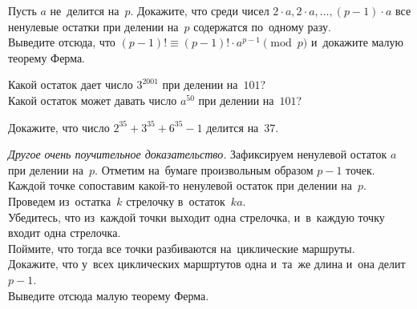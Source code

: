 \begin{problems}

\item
\subproblem
Пусть $a$ не~делится на~$p$.
Докажите, что среди чисел $2 \cdot a, 2 \cdot a, \ldots, (p - 1) \cdot a$ все
ненулевые остатки при делении на~$p$ содержатся по~одному разу.
\\
\subproblem
Выведите отсюда, что $(p - 1)! \equiv (p-1)! \cdot a^{p-1} \pmod{p}$ и~докажите
малую теорему Ферма.

\item
\subproblem
Какой остаток дает число $3^{2001}$ при делении на~$101$?
\\
\subproblem
Какой остаток может давать число $a^{50}$ при делении на~$101$?

\item
Докажите, что число $2^{35} + 3^{35} + 6^{35} - 1$ делится на~$37$.

\item
\emph{Другое очень поучительное доказательство.}
Зафиксируем ненулевой остаток $a$ при делении на~$p$.
Отметим на~бумаге произвольным образом $p - 1$ точек.
Каждой точке сопоставим какой-то ненулевой остаток при делении на~$p$.
Проведем из~остатка~$k$ стрелочку в~остаток~$ka$.
\\
\subproblem
Убедитесь, что из~каждой точки выходит одна стрелочка, и~в~каждую точку входит
одна стрелочка.
\\
\subproblem
Поймите, что тогда все точки разбиваются на~циклические маршруты.
\\
\subproblem
Докажите, что у~всех циклических маршртутов одна и~та~же длина и~она делит
$p - 1$.
\\
\subproblem
Выведите отсюда малую теорему Ферма.

\end{problems}

